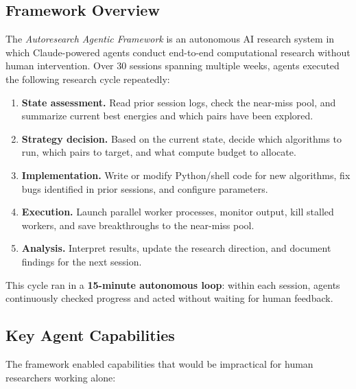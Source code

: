 \documentclass[11pt,a4paper]{article}
\theoremstyle{remark}
\begin{document}
\subsection{Framework Overview}

The \emph{Autoresearch Agentic Framework} is an autonomous AI research system in which
Claude-powered agents conduct end-to-end computational research without human intervention.
Over 30 sessions spanning multiple weeks, agents executed the following research cycle
repeatedly:

\begin{enumerate}
  \item \textbf{State assessment.} Read prior session logs, check the near-miss pool, and
    summarize current best energies and which pairs have been explored.
  \item \textbf{Strategy decision.} Based on the current state, decide which algorithms to
    run, which pairs to target, and what compute budget to allocate.
  \item \textbf{Implementation.} Write or modify Python/shell code for new algorithms,
    fix bugs identified in prior sessions, and configure parameters.
  \item \textbf{Execution.} Launch parallel worker processes, monitor output, kill stalled
    workers, and save breakthroughs to the near-miss pool.
  \item \textbf{Analysis.} Interpret results, update the research direction, and document
    findings for the next session.
\end{enumerate}

This cycle ran in a \textbf{15-minute autonomous loop}: within each session, agents
continuously checked progress and acted without waiting for human feedback.

\subsection{Key Agent Capabilities}

The framework enabled capabilities that would be impractical for human researchers working
alone:
\end{document}
